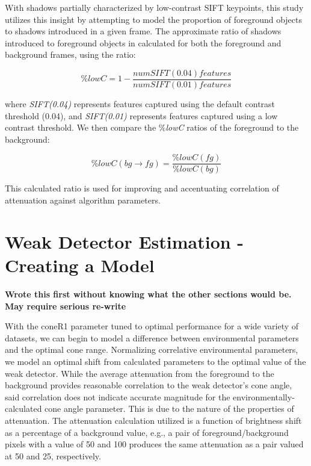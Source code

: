 \documentclass[12pt]{report}
\begin{document}
With shadows partially characterized by low-contrast SIFT keypoints, this study utilizes this insight by attempting to model the proportion of foreground objects to shadows introduced in a given frame. The approximate ratio of shadows introduced to foreground objects in calculated for both the foreground and background frames, using the ratio:

\begin{equation}
\%lowC = 1 - \dfrac{num SIFT(0.04) features}{num SIFT(0.01) features}
\end{equation}

where \textit{SIFT(0.04)} represents features captured using the default contrast threshold (0.04), and \textit{SIFT(0.01)} represents features captured using a low contrast threshold. We then compare the \%\textit{lowC} ratios of the foreground to the background:

\begin{equation}
\%lowC(bg \rightarrow fg) = \dfrac{\%lowC(fg)}{\%lowC(bg)}
\end{equation}

This calculated ratio is used for improving and accentuating correlation of attenuation against algorithm parameters.

\section{Weak Detector Estimation - Creating a Model} \label{section:model}

\textbf{Wrote this first without knowing what the other sections would be. May require serious re-write}

With the coneR1 parameter tuned to optimal performance for a wide variety of datasets, we can begin to model a difference between environmental parameters and the optimal cone range. Normalizing correlative environmental parameters, we model an optimal shift from calculated parameters to the optimal value of the weak detector. While the average attenuation from the foreground to the background provides reasonable correlation to the weak detector's cone angle, said correlation does not indicate accurate magnitude for the environmentally-calculated cone angle parameter. This is due to the nature of the properties of attenuation. The attenuation calculation utilized is a function of brightness shift as a percentage of a background value, e.g., a pair of foreground/background pixels with a value of 50 and 100 produces the same attenuation as a pair valued at 50 and 25, respectively.
\end{document}

